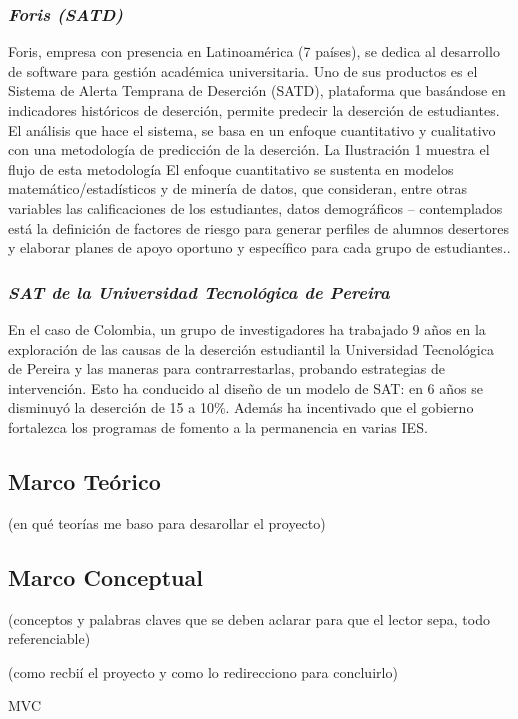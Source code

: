   \subsubsection{\textit{Foris (SATD)}}
  Foris, empresa con presencia en Latinoamérica (7 países), se dedica al desarrollo de software para gestión académica universitaria. Uno de sus productos es el Sistema de Alerta Temprana de Deserción (SATD), plataforma que basándose en indicadores históricos de deserción, permite predecir la deserción de estudiantes. El análisis que hace el sistema, se basa en un enfoque cuantitativo y cualitativo con una metodología de predicción de la deserción. La Ilustración 1 muestra el flujo de
  esta metodología
  El enfoque cuantitativo se sustenta en modelos matemático/estadísticos y de minería de datos, que consideran, entre otras variables las calificaciones de los estudiantes, datos demográficos – contemplados está la definición de factores de riesgo para generar perfiles de alumnos desertores y elaborar planes de apoyo oportuno y específico para cada grupo de estudiantes.\cite{SATPaper}.
 
   \subsubsection{\textit{SAT de la Universidad Tecnológica de Pereira}}
 En el caso de Colombia, un grupo de investigadores ha trabajado 9 años en la exploración de las causas de la deserción estudiantil la Universidad Tecnológica de Pereira y las maneras para contrarrestarlas, probando estrategias de intervención. Esto ha conducido al diseño de un modelo de SAT: en 6 años se disminuyó la deserción de 15 a 10\%. Además ha incentivado que el gobierno fortalezca los programas de fomento a la permanencia en varias IES. \cite{carvajal}
 
\subsection{Marco Teórico}
(en qué teorías me baso para desarollar el proyecto)
\subsection{Marco Conceptual}

(conceptos y palabras claves que se deben aclarar para que el lector sepa, todo referenciable)

(como recbií el proyecto y como lo redirecciono para concluirlo)

MVC 


